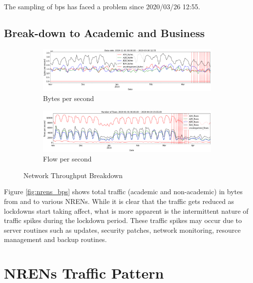 \documentclass[10pt, journal, letterpaper]{IEEEtran}
\newcommand\linearFigSze{0.48}
\begin{document}
The sampling of bps has faced a problem since 2020/03/26 12:55. 

\subsection{Break-down to Academic and Business}
\begin{figure}
    \begin{subfigure}{\linearFigSze\textwidth}
          \centering
          \includegraphics[width=\columnwidth]{img/traffic_trend_bps_AcaVsBus.png}
          \caption{Bytes per second}
          \label{fig:traffic_trend_acaVSbusi_bps}
    \end{subfigure}
    \begin{subfigure}{\linearFigSze\textwidth}
          \centering
          \includegraphics[width=\columnwidth]{img/traffic_trend_fps_AcaVsBus.png}
          \caption{Flow per second}
          \label{fig:traffic_trend_acaVSbusi_fps}
    \end{subfigure}
    \caption{Network Throughput Breakdown}
    \label{fig:network_throughput_breakdown}
\end{figure}

Figure \ref{fig:nrens_bps} shows total traffic (academic and non-academic) in bytes from and to various NRENs. While it is clear that the traffic gets reduced as lockdowns start taking affect, what is more apparent is the intermittent nature of traffic spikes during the lockdown period. These traffic spikes may occur due to server routines such as updates, security patches, network monitoring, resource management and backup routines.

\section{NRENs Traffic Pattern}
\end{document}

